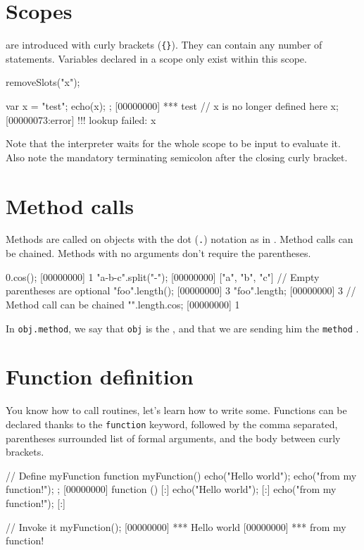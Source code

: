 \section{Scopes}
 are introduced with curly brackets (\lstinline|{}|).  They can
contain any number of statements. Variables declared in a scope only exist
within this scope.

\begin{urbicomment}
removeSlots("x");
\end{urbicomment}
\begin{urbiscript}
{
  var x = "test";
  echo(x);
};
[00000000] *** test
// x is no longer defined here
x;
[00000073:error] !!! lookup failed: x
\end{urbiscript}

Note that the interpreter waits for the whole scope to be input to evaluate
it. Also note the mandatory terminating semicolon after the closing curly
bracket.

\section{Method calls}

Methods are called on objects with the dot (\lstinline{.}) notation as in
\Cxx.  Method calls can be chained.  Methods with no arguments don't require
the parentheses.

\begin{urbiscript}
0.cos();
[00000000] 1
"a-b-c".split("-");
[00000000] ["a", "b", "c"]
// Empty parentheses are optional
"foo".length();
[00000000] 3
"foo".length;
[00000000] 3
// Method call can be chained
"".length.cos;
[00000000] 1
\end{urbiscript}

In \lstinline|obj.method|, we say that \lstinline{obj} is the
, and that we are sending him the \lstinline{method}
.

\section{Function definition}

You know how to call routines, let's learn how to write
some. Functions can be declared thanks to the \lstinline{function}
keyword, followed by the comma separated, parentheses surrounded list
of formal arguments, and the body between curly brackets.

\begin{urbiscript}
// Define myFunction
function myFunction()
{
  echo("Hello world");
  echo("from my function!");
};
[00000000] function () {
[:]  echo("Hello world");
[:]  echo("from my function!");
[:]}

// Invoke it
myFunction();
[00000000] *** Hello world
[00000000] *** from my function!
\end{urbiscript}

